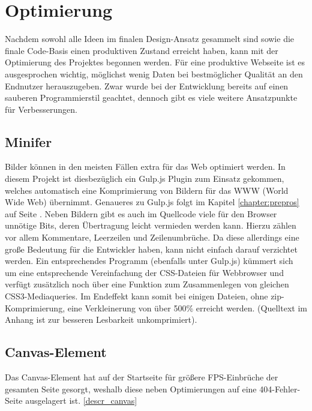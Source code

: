 \section{Optimierung}
Nachdem sowohl alle Ideen im finalen Design-Ansatz gesammelt sind sowie die finale Code-Basis einen produktiven Zustand erreicht haben, kann mit der Optimierung des Projektes begonnen werden. Für eine produktive Webseite ist es ausgesprochen wichtig, möglichst wenig Daten bei bestmöglicher Qualität an den Endnutzer herauszugeben. Zwar wurde bei der Entwicklung bereits auf einen sauberen Programmierstil geachtet, dennoch gibt es viele weitere Ansatzpunkte für Verbesserungen.

\subsection{Minifer}
Bilder können in den meisten Fällen extra für das Web optimiert werden. In diesem Projekt ist diesbezüglich ein Gulp.js Plugin zum Einsatz gekommen, welches automatisch eine Komprimierung von Bildern für das WWW (World Wide Web) übernimmt. Genaueres zu Gulp.js folgt im Kapitel \ref{chapter:prepros} auf Seite \pageref{chapter:prepros}.
Neben Bildern gibt es auch im Quellcode viele für den Browser unnötige Bits, deren Übertragung leicht vermieden werden kann. Hierzu zählen vor allem Kommentare, Leerzeilen und Zeilenumbrüche. Da diese allerdings eine große Bedeutung für die Entwickler haben, kann nicht einfach darauf verzichtet werden. Ein entsprechendes Programm (ebenfalls unter Gulp.js) kümmert sich um eine entsprechende Vereinfachung der CSS-Dateien für Webbrowser und verfügt zusätzlich noch über eine Funktion zum Zusammenlegen von gleichen CSS3-Mediaqueries. Im Endeffekt kann somit bei einigen Dateien, ohne zip-Komprimierung, eine Verkleinerung von über 500\% erreicht werden. (Quelltext im Anhang ist zur besseren Lesbarkeit unkomprimiert).

\subsection{Canvas-Element}
Das Canvas-Element hat auf der Startseite für größere FPS-Einbrüche der gesamten Seite gesorgt, weshalb diese neben Optimierungen auf eine 404-Fehler-Seite ausgelagert ist. \ref{descr_canvas}
